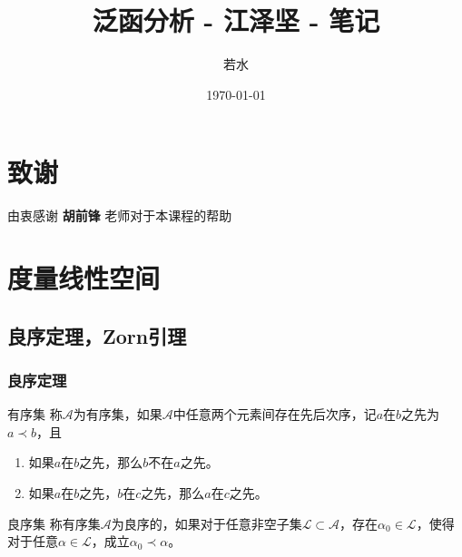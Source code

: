 \documentclass[lang = cn, scheme = chinese, thmcnt = section]{elegantbook}
\title{泛函分析 - 江泽坚 - 笔记}                %
\author{若水}                        %
\date{\today}                       %
\newcommand{\sub}{\subset}             %
\begin{document}
\maketitle       %

\frontmatter     %

\chapter*{致谢}


\vspace*{\fill}
	\begin{center}
	
		\large{由衷感谢 \textbf{ 胡前锋 } 老师对于本课程的帮助}
	
	\end{center}
\vspace*{\fill}

\tableofcontents %

\mainmatter      %

\chapter{度量线性空间}

\section{良序定理，Zorn引理}

\subsection{良序定理}

\begin{definition}{有序集}
	称$\mathscr{A}$为有序集，如果$\mathscr{A}$中任意两个元素间存在先后次序，记$a$在$b$之先为$a\prec b$，且
	\begin{enumerate}
		\item 如果$a$在$b$之先，那么$b$不在$a$之先。
		\item 如果$a$在$b$之先，$b$在$c$之先，那么$a$在$c$之先。
	\end{enumerate}
\end{definition}

\begin{definition}{良序集}
	称有序集$\mathscr{A}$为良序的，如果对于任意非空子集$\mathscr{L}\sub \mathscr{A}$，存在$\alpha_0\in\mathscr{L}$，使得对于任意$\alpha\in \mathscr{L}$，成立$\alpha_0\prec \alpha$。
\end{definition}
\end{document}
